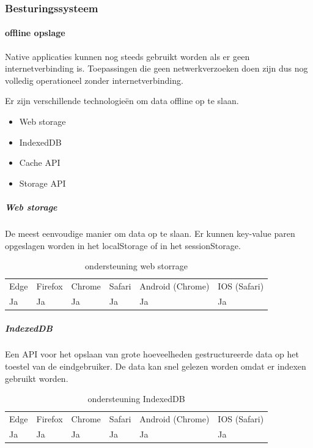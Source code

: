\subsubsection{Besturingssysteem}
\paragraph{offline opslage}
Native applicaties kunnen nog steeds gebruikt worden als er geen internetverbinding is. Toepassingen die geen netwerkverzoeken doen zijn dus nog volledig operationeel zonder internetverbinding. 

Er zijn verschillende technologieën om data offline op te slaan. 

 \begin{itemize}
	\item	Web storage
	\item	IndexedDB
	\item	Cache API
	\item	Storage API
\end{itemize}

	\subparagraph{Web storage}
	De meest eenvoudige manier om data op te slaan. Er kunnen key-value paren opgeslagen worden in het localStorage of in het sessionStorage. 
	\autocite{Hickson2020}
	
	\begin{table}[H]
		\centering
		\begin{tabular}{llllll}
			Edge & Firefox & Chrome & Safari & Android (Chrome) & IOS (Safari) \\
			Ja   & Ja      &  Ja     & Ja     & Ja               & Ja          
		\end{tabular}	
		\caption{ondersteuning web storrage }
		\label{ondersteuning web storrage}
	\end{table}
	
	
	
	\subparagraph{IndexedDB}
	Een API voor het opslaan van grote hoeveelheden gestructureerde data op het toestel van de eindgebruiker. De data kan snel gelezen worden omdat er indexen gebruikt worden. 
	\autocite{Alabbas2020}
	
	\begin{table}[H]
		\centering
			\begin{tabular}{llllll}
				Edge & Firefox & Chrome & Safari & Android (Chrome) & IOS (Safari) \\
				Ja   & Ja      &  Ja     & Ja     & Ja               & Ja          
			\end{tabular}	
			\caption{ondersteuning IndexedDB}
			\label{ondersteuning IndexedDB}
	\end{table}
	
